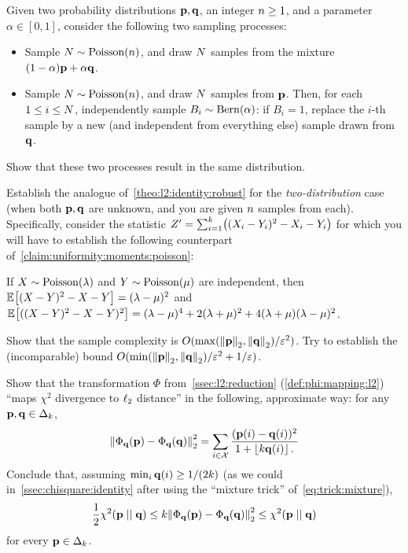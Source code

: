 \begin{question}\label{ex:mixture:sample}
Given two probability distributions $\p,\q$, an integer $\ns\geq 1$, and a parameter $\alpha\in[0,1]$, consider the following two sampling processes:
\begin{itemize}
  \item Sample $\occur \sim \poisson{\ns}$, and draw $\occur$ \iid samples from the mixture $(1-\alpha)\p+\alpha\q$.
  \item Sample $\occur \sim \poisson{\ns}$, and draw $\occur$ \iid samples from $\p$. Then, for each $1\leq i\leq \occur$, independently sample $B_i\sim\bernoulli{\alpha}$: if $B_i=1$, replace the $i$-th sample by a new (and independent from everything else) sample drawn from $\q$.
\end{itemize}
Show that these two processes result in the same distribution.
\end{question}
\begin{question}[$\star$]\label{ex:l2:closeness}
Establish the analogue of~\cref{theo:l2:identity:robust} for the \emph{two-distribution} case (when both $\p,\q$ are unknown, and you are given $\ns$ \iid samples from each). Specifically, consider the statistic
$Z'=\sum_{i=1}^\ab \Paren{(X_i-Y_i)^2-X_i-Y_i}$
for which you will have to establish the following counterpart of~\cref{claim:uniformity:moments:poisson}:
\begin{claim}
If $X\sim\poisson{\lambda}$ and $Y\sim\poisson{\mu}$ are independent, then 
  $
  \bEE{(X-Y)^2-X-Y} = (\lambda-\mu)^2
  $
  and 
  $
  \bEE{((X-Y)^2-X-Y)^2} = (\lambda-\mu)^4 + 2(\lambda+\mu)^2 + 4(\lambda+\mu)(\lambda-\mu)^2
  $.
\end{claim}
\noindent Show that the sample complexity is $O(\max\Paren{\normtwo{\p},\normtwo{\q}}/\dst^2)$. Try to establish the (incomparable) bound $O(\min\Paren{\normtwo{\p},\normtwo{\q}}/\dst^2+1/\dst)$.
\end{question}
\begin{question}\label{ex:l2:reduction:chisquare}
Show that the transformation $\Phi$ from~\cref{ssec:l2:reduction} (\cref{def:phi:mapping:l2}) ``maps $\chi^2$ divergence to $\lp[2]$ distance'' in the following, approximate way: for any $\p,\q\in\distribs{\ab}$, 
\[
	\normtwo{\Phi_\q(\p)-\Phi_\q(\q)}^2 = \sum_{i\in\domain}\frac{(\p(i)-\q(i))^2}{1+\flr{\ab\q(i)}\,.}
\]
Conclude that, assuming $\min_i \q(i) \geq 1/(2\ab)$ (as we could in~\cref{ssec:chisquare:identity} after using the ``mixture trick'' of~\cref{eq:trick:mixture}), 
\[
	\frac{1}{2}\chisquare{\p}{\q}\leq \ab\normtwo{\Phi_\q(\p)-\Phi_\q(\q)}^2 \leq \chisquare{\p}{\q}
\]
for every $\p\in\distribs{\ab}$.
\end{question}
